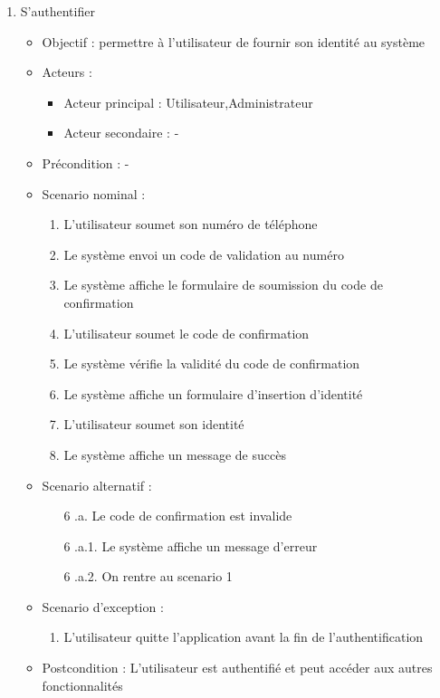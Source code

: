 \begin{enumerate}[label=\alph*.]
	\item S’authentifier
	\begin{itemize}
		\item Objectif : permettre à l’utilisateur de fournir son identité au système
		\item Acteurs :
		\begin{itemize}
			\item Acteur principal : Utilisateur,Administrateur
			\item Acteur secondaire : -
		\end{itemize}
		\item Précondition : -
		\item Scenario nominal :
		\begin{enumerate}[label=\arabic*.]
			\item L’utilisateur soumet son numéro de téléphone
			\item Le système envoi un code de validation au numéro
			\item Le système affiche le formulaire de soumission du code de confirmation
			\item L’utilisateur soumet le code de confirmation
			\item Le système vérifie la validité du code de confirmation
			\item Le système affiche un formulaire d’insertion d’identité
			\item L’utilisateur soumet son identité
			\item Le système affiche un message de succès 
		\end{enumerate}
		\item Scenario alternatif :
		\begin{enumerate}[label=\arabic*.]
		\item[6] .a. Le code de confirmation est invalide
		\item[6] .a.1. Le système affiche un message d’erreur
		\item[6] .a.2. On rentre au scenario 1
		\end{enumerate}
		\item Scenario d’exception : 
		\begin{enumerate}[label=\arabic*.]
			\item L’utilisateur quitte l’application avant la fin de l’authentification
		\end{enumerate}
		\item Postcondition : L’utilisateur est authentifié et peut accéder aux autres fonctionnalités
	\end{itemize}
	

\end{enumerate}
